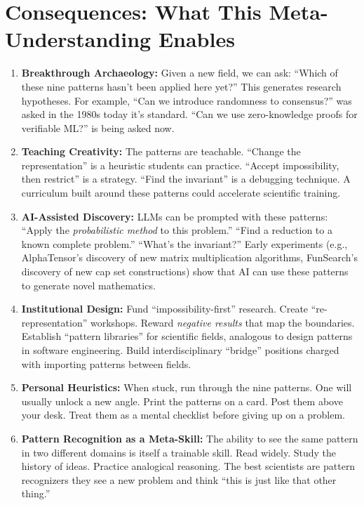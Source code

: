 \section{Consequences: What This Meta-Understanding Enables}
\label{sec:anatomy:consequences}

\begin{enumerate}
\item \textbf{Breakthrough Archaeology:} Given a new field, we can ask: ``Which of these nine patterns hasn't been applied here yet?'' This generates research hypotheses. For example, ``Can we introduce randomness to consensus?'' was asked in the 1980s today it's standard. ``Can we use zero-knowledge proofs for verifiable ML?'' is being asked now.

\item \textbf{Teaching Creativity:} The patterns are teachable. ``Change the representation'' is a heuristic students can practice. ``Accept impossibility, then restrict'' is a strategy. ``Find the invariant'' is a debugging technique. A curriculum built around these patterns could accelerate scientific training.

\item \textbf{AI-Assisted Discovery:} LLMs can be prompted with these patterns: ``Apply the \emph{probabilistic method} to this problem.'' ``Find a reduction to a known complete problem.'' ``What's the invariant?'' Early experiments (e.g., AlphaTensor's discovery of new matrix multiplication algorithms, FunSearch's discovery of new cap set constructions) show that AI can use these patterns to generate novel mathematics.

\item \textbf{Institutional Design:} Fund ``impossibility-first'' research. Create ``re-representation'' workshops. Reward \emph{negative results} that map the boundaries. Establish ``pattern libraries'' for scientific fields, analogous to design patterns in software engineering. Build interdisciplinary ``bridge'' positions charged with importing patterns between fields.

\item \textbf{Personal Heuristics:} When stuck, run through the nine patterns. One will usually unlock a new angle. Print the patterns on a card. Post them above your desk. Treat them as a mental checklist before giving up on a problem.

\item \textbf{Pattern Recognition as a Meta-Skill:} The ability to see the same pattern in two different domains is itself a trainable skill. Read widely. Study the history of ideas. Practice analogical reasoning. The best scientists are pattern recognizers they see a new problem and think ``this is just like that other thing.''


\end{enumerate}
